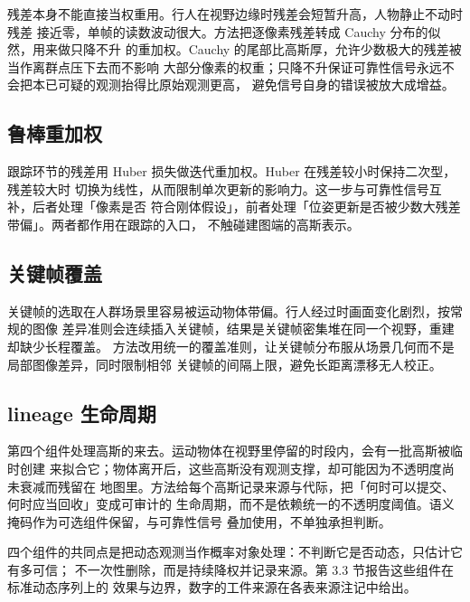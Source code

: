 残差本身不能直接当权重用。行人在视野边缘时残差会短暂升高，人物静止不动时残差
接近零，单帧的读数波动很大。方法把逐像素残差转成 Cauchy 分布的似然，用来做只降不升
的重加权。Cauchy 的尾部比高斯厚，允许少数极大的残差被当作离群点压下去而不影响
大部分像素的权重；只降不升保证可靠性信号永远不会把本已可疑的观测抬得比原始观测更高，
避免信号自身的错误被放大成增益。

\subsection{鲁棒重加权}

跟踪环节的残差用 Huber 损失做迭代重加权。Huber 在残差较小时保持二次型，残差较大时
切换为线性，从而限制单次更新的影响力。这一步与可靠性信号互补，后者处理「像素是否
符合刚体假设」，前者处理「位姿更新是否被少数大残差带偏」。两者都作用在跟踪的入口，
不触碰建图端的高斯表示。

\subsection{关键帧覆盖}

关键帧的选取在人群场景里容易被运动物体带偏。行人经过时画面变化剧烈，按常规的图像
差异准则会连续插入关键帧，结果是关键帧密集堆在同一个视野，重建却缺少长程覆盖。
方法改用统一的覆盖准则，让关键帧分布服从场景几何而不是局部图像差异，同时限制相邻
关键帧的间隔上限，避免长距离漂移无人校正。

\subsection{lineage 生命周期}

第四个组件处理高斯的来去。运动物体在视野里停留的时段内，会有一批高斯被临时创建
来拟合它；物体离开后，这些高斯没有观测支撑，却可能因为不透明度尚未衰减而残留在
地图里。方法给每个高斯记录来源与代际，把「何时可以提交、何时应当回收」变成可审计的
生命周期，而不是依赖统一的不透明度阈值。语义掩码作为可选组件保留，与可靠性信号
叠加使用，不单独承担判断。

四个组件的共同点是把动态观测当作概率对象处理：不判断它是否动态，只估计它有多可信；
不一次性删除，而是持续降权并记录来源。第 3.3 节报告这些组件在标准动态序列上的
效果与边界，数字的工件来源在各表来源注记中给出。


